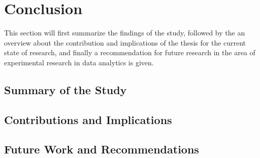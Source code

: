 \newpage\section{Conclusion}

This section will first summarize the findings of the study, followed by the an overview about the contribution and implications of the thesis for the current state of research, and finally a recommendation for future research in the area of experimental research in data analytics is given. 

\subsection{Summary of the Study}

\subsection{Contributions and Implications}

\subsection{Future Work and Recommendations}